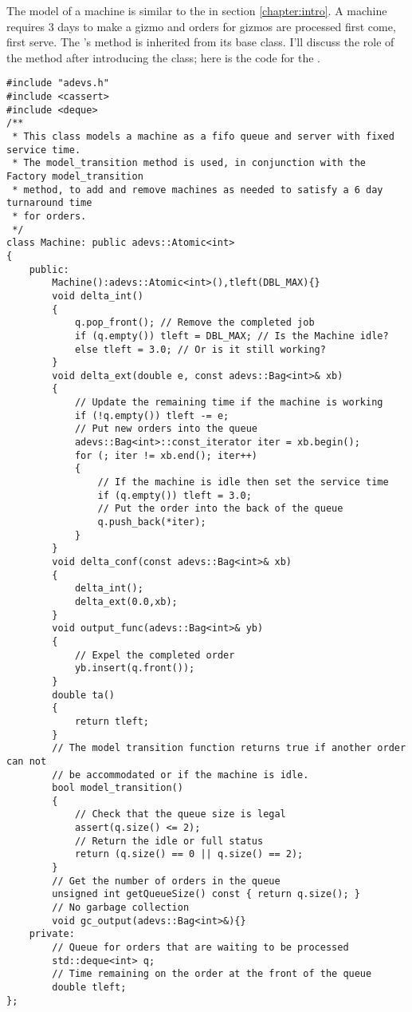 The model of a machine is similar to the  in section \ref{chapter:intro}. A machine requires 3 days to make a gizmo and orders for gizmos are processed first come, first serve. The 's  method is inherited from its  base class. I'll discuss the role of the  method after introducing the  class; here is the code for the .
\begin{verbatim}
#include "adevs.h"
#include <cassert>
#include <deque>
/**
 * This class models a machine as a fifo queue and server with fixed service time.
 * The model_transition method is used, in conjunction with the Factory model_transition
 * method, to add and remove machines as needed to satisfy a 6 day turnaround time
 * for orders. 
 */
class Machine: public adevs::Atomic<int> 
{
    public:
        Machine():adevs::Atomic<int>(),tleft(DBL_MAX){}
        void delta_int()
        {
            q.pop_front(); // Remove the completed job
            if (q.empty()) tleft = DBL_MAX; // Is the Machine idle?
            else tleft = 3.0; // Or is it still working?
        }
        void delta_ext(double e, const adevs::Bag<int>& xb)
        {
            // Update the remaining time if the machine is working
            if (!q.empty()) tleft -= e;
            // Put new orders into the queue
            adevs::Bag<int>::const_iterator iter = xb.begin();
            for (; iter != xb.end(); iter++) 
            {
                // If the machine is idle then set the service time
                if (q.empty()) tleft = 3.0;
                // Put the order into the back of the queue
                q.push_back(*iter);
            }
        }
        void delta_conf(const adevs::Bag<int>& xb)
        {
            delta_int();
            delta_ext(0.0,xb);
        }
        void output_func(adevs::Bag<int>& yb)
        {
            // Expel the completed order
            yb.insert(q.front());
        }
        double ta()
        {
            return tleft;
        }
        // The model transition function returns true if another order can not
        // be accommodated or if the machine is idle.
        bool model_transition()
        {
            // Check that the queue size is legal
            assert(q.size() <= 2);
            // Return the idle or full status
            return (q.size() == 0 || q.size() == 2);
        }
        // Get the number of orders in the queue
        unsigned int getQueueSize() const { return q.size(); }
        // No garbage collection 
        void gc_output(adevs::Bag<int>&){}
    private:
        // Queue for orders that are waiting to be processed
        std::deque<int> q;
        // Time remaining on the order at the front of the queue
        double tleft; 
};
\end{verbatim}

